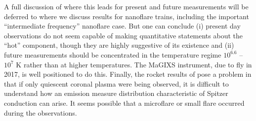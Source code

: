 \documentclass[apj]{emulateapj}
\begin{document}
	\par A full discussion of where this leads for present and future measurements will be deferred to  where we discuss results for nanoflare trains, including the important ``intermediate frequency'' nanoflare case. But one can conclude (i) present day observations do not seem capable of making quantitative statements about the ``hot'' component, though they are highly suggestive of its existence and (ii) future measurements should be concentrated in the temperature regime $10^{6.6}$ – $10^7$ K rather than at higher temperatures. The MaGIXS instrument, due to fly in 2017, is well positioned to do this. Finally, the rocket results of \citet{caspi_new_2015} pose a problem in that if only quiescent coronal plasma were being observed, it is difficult to understand how an emission measure distribution characteristic of Spitzer conduction can arise. It seems possible that a microflare or small flare occurred during the observations.
	\appendix
\end{document}
